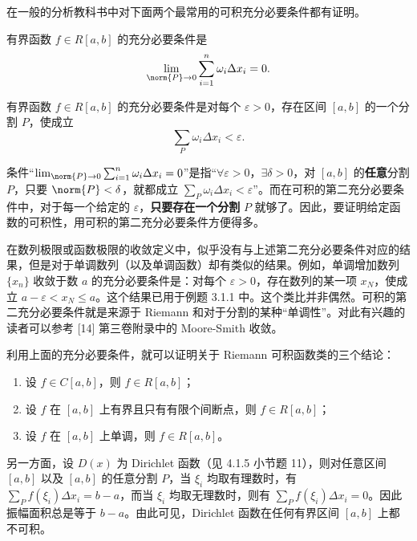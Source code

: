 在一般的分析教科书中对下面两个最常用的可积充分必要条件都有证明。

\begin{xtheorem}[10.1.2（可积的第一充分必要条件）]
有界函数 $f\in R[a,b]$ 的充分必要条件是
\[
  \lim_{\norm{P}\to0}\sum_{i=1}^n\omega_i\Delta x_i=0.
\]
\end{xtheorem}

\begin{xtheorem}[10.1.3（可积的第二充分必要条件）]
有界函数 $f\in R[a,b]$ 的充分必要条件是对每个 $\varepsilon>0$，存在区间 $[a,b]$ 的一个分割 $P$，使成立
\[
  \sum_P\omega_i\Delta x_i<\varepsilon.
\]
\end{xtheorem}

\begin{xremark}
条件“$\lim_{\norm{P}\to0}\sum_{i=1}^n\omega_i\Delta x_i=0$”是指“$\forall\varepsilon>0$，$\exists\delta>0$，对 $[a,b]$ 的\textbf{任意}分割 $P$，只要 $\norm{P}<\delta$，就都成立 $\sum_P\omega_i\Delta x_i<\varepsilon$”。而在可积的第二充分必要条件中，对于每一个给定的 $\varepsilon$，\textbf{只要存在一个分割} $P$ 就够了。因此，要证明给定函数的可积性，用可积的第二充分必要条件方便得多。
\end{xremark}

\begin{xremark}
在数列极限或函数极限的收敛定义中，似乎没有与上述第二充分必要条件对应的结果，但是对于单调数列（以及单调函数）却有类似的结果。例如，单调增加数列 $\{x_n\}$ 收敛于数 $a$ 的充分必要条件是：对每个 $\varepsilon>0$，存在数列的某一项 $x_N$，使成立 $a-\varepsilon<x_N\leqslant a$。这个结果已用于例题 3.1.1 中。这个类比并非偶然。可积的第二充分必要条件就是来源于 Riemann 和对于分割的某种“单调性”。对此有兴趣的读者可以参考 [14] 第三卷附录中的 Moore-Smith 收敛。
\end{xremark}

利用上面的充分必要条件，就可以证明关于 Riemann 可积函数类的三个结论：
\begin{enumerate}
  \item 设 $f\in C[a,b]$，则 $f\in R[a,b]$；
  \item 设 $f$ 在 $[a,b]$ 上有界且只有有限个间断点，则 $f\in R[a,b]$；
  \item 设 $f$ 在 $[a,b]$ 上单调，则 $f\in R[a,b]$。
\end{enumerate}

另一方面，设 $D(x)$ 为 Dirichlet 函数（见 4.1.5 小节题 11），则对任意区间 $[a,b]$ 以及 $[a,b]$ 的任意分割 $P$，当 $\xi_i$ 均取有理数时，有 $\sum_P f(\xi_i)\Delta x_i=b-a$，而当 $\xi_i$ 均取无理数时，则有 $\sum_P f(\xi_i)\Delta x_i=0$。因此振幅面积总是等于 $b-a$。由此可见，Dirichlet 函数在任何有界区间 $[a,b]$ 上都不可积。

